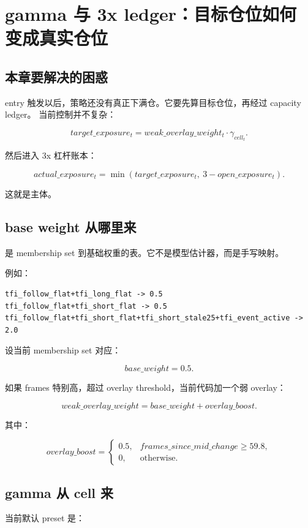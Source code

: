\chapter{gamma 与 3x ledger：目标仓位如何变成真实仓位}

\section{本章要解决的困惑}

entry 触发以后，策略还没有真正下满仓。它要先算目标仓位，再经过 capacity ledger。
当前控制并不复杂：

\[
target\_exposure_t = weak\_overlay\_weight_t \cdot \gamma_{cell_t}.
\]

然后进入 3x 杠杆账本：

\[
actual\_exposure_t
= \min(target\_exposure_t,\ 3-open\_exposure_t).
\]

这就是主体。

\section{base weight 从哪里来}

 是 membership set 到基础权重的表。它不是模型估计器，而是手写映射。

例如：

\begin{lstlisting}
tfi_follow_flat+tfi_long_flat -> 0.5
tfi_follow_flat+tfi_short_flat -> 0.5
tfi_follow_flat+tfi_short_flat+tfi_short_stale25+tfi_event_active -> 2.0
\end{lstlisting}

设当前 membership set 对应：

\[
base\_weight=0.5.
\]

如果 frames 特别高，超过 overlay threshold，当前代码加一个弱 overlay：

\[
weak\_overlay\_weight
= base\_weight + overlay\_boost.
\]

其中：

\[
overlay\_boost =
\begin{cases}
0.5, & frames\_since\_mid\_change \ge 59.8,\\
0, & \text{otherwise}.
\end{cases}
\]

\section{gamma 从 cell 来}

当前默认  preset 是：

